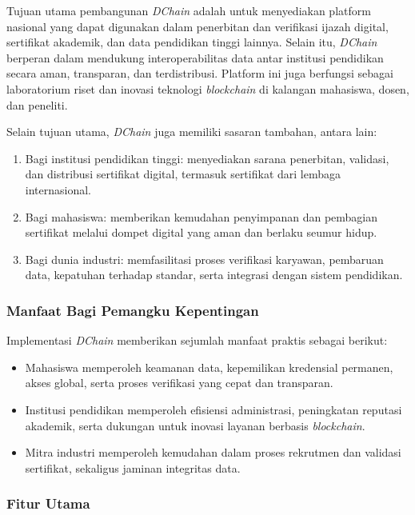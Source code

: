 Tujuan utama pembangunan \textit{DChain} adalah untuk menyediakan platform nasional yang dapat digunakan dalam penerbitan dan verifikasi ijazah digital, sertifikat akademik, dan data pendidikan tinggi lainnya. Selain itu, \textit{DChain} berperan dalam mendukung interoperabilitas data antar institusi pendidikan secara aman, transparan, dan terdistribusi. Platform ini juga berfungsi sebagai laboratorium riset dan inovasi teknologi \textit{blockchain} di kalangan mahasiswa, dosen, dan peneliti.

Selain tujuan utama, \textit{DChain} juga memiliki sasaran tambahan, antara lain:

\begin{enumerate}[nolistsep]
    \item Bagi institusi pendidikan tinggi: menyediakan sarana penerbitan, validasi, dan distribusi sertifikat digital, termasuk sertifikat dari lembaga internasional.
    \item Bagi mahasiswa: memberikan kemudahan penyimpanan dan pembagian sertifikat melalui dompet digital yang aman dan berlaku seumur hidup.
    \item Bagi dunia industri: memfasilitasi proses verifikasi karyawan, pembaruan data, kepatuhan terhadap standar, serta integrasi dengan sistem pendidikan.
\end{enumerate}

\subsubsection{Manfaat Bagi Pemangku Kepentingan}

Implementasi \textit{DChain} memberikan sejumlah manfaat praktis sebagai berikut:
\begin{itemize}[nolistsep]
    \item Mahasiswa memperoleh keamanan data, kepemilikan kredensial permanen, akses global, serta proses verifikasi yang cepat dan transparan.
    \item Institusi pendidikan memperoleh efisiensi administrasi, peningkatan reputasi akademik, serta dukungan untuk inovasi layanan berbasis \textit{blockchain}.
    \item Mitra industri memperoleh kemudahan dalam proses rekrutmen dan validasi sertifikat, sekaligus jaminan integritas data.
\end{itemize}

\subsubsection{Fitur Utama}

